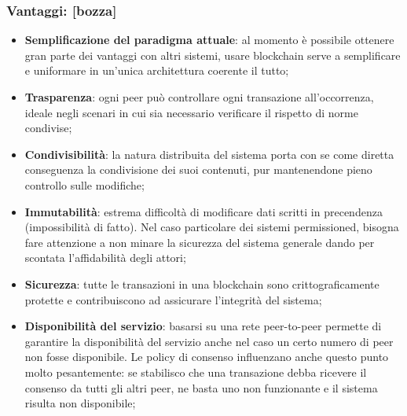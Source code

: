 		\subsubsection{Vantaggi: [bozza]}
			\begin{itemize}
				\item \textbf{Semplificazione del paradigma attuale}: al momento è possibile ottenere gran parte dei vantaggi con altri sistemi, usare blockchain serve a semplificare e uniformare in un'unica architettura coerente il tutto;
				\item \textbf{Trasparenza}: ogni peer può controllare ogni transazione all'occorrenza, ideale negli scenari in cui sia necessario verificare il rispetto di norme condivise;
				\item \textbf{Condivisibilità}: la natura distribuita del sistema porta con se come diretta conseguenza la condivisione dei suoi contenuti, pur mantenendone pieno controllo sulle modifiche;
				\item \textbf{Immutabilità}: estrema difficoltà di modificare dati scritti in precendenza (impossibilità di fatto). Nel caso particolare dei sistemi permissioned, bisogna fare attenzione a non minare la sicurezza del sistema generale dando per scontata l'affidabilità degli attori;
				\item \textbf{Sicurezza}: tutte le transazioni in una blockchain sono crittograficamente protette e contribuiscono ad assicurare l'integrità del sistema;
				\item \textbf{Disponibilità del servizio}: basarsi su una rete peer-to-peer permette di garantire la disponibilità del servizio anche nel caso un certo numero di peer non fosse disponibile. Le policy di consenso influenzano anche questo punto molto pesantemente: se stabilisco che una transazione debba ricevere il consenso da tutti gli altri peer, ne basta uno non funzionante e il sistema risulta non disponibile;
			\end{itemize}
